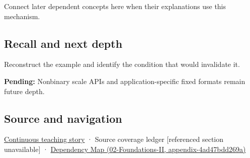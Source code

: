 Connect later dependent concepts here when their explanations use this mechanism.

\subsection{Recall and next depth}\label{appendix-1d0dbe8924cc-recall-and-next-depth}

Reconstruct the example and identify the condition that would invalidate it.

\textbf{Pending:} Nonbinary scale APIs and application-specific fixed formats remain future depth.

\subsection{Source and navigation}\label{appendix-1d0dbe8924cc-source-and-navigation}

\hyperref[01-foundations-i-ch001-choosing-what-information-to-keep]{Continuous teaching story} · {Source coverage ledger {[}referenced section unavailable{]}} · \href{../02-Foundations-II/main.pdf\#nameddest=appendix-4ad47bdd269a}{Dependency Map (02-Foundations-II, appendix-4ad47bdd269a)}
